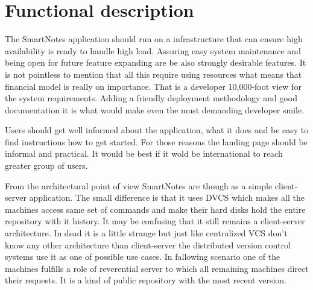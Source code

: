 \section{Functional description}\label{sec:functional_descr}
The SmartNotes application should run on a infrastructure that can ensure high availability is ready to handle high load. Assuring easy system maintenance and being open for future feature expanding are be also strongly desirable features. It is not pointless to mention that all this require using resources what means that financial model is really on importance. That is a developer 10,000-foot view for the system requirements. Adding a friendly deployment methodology and good documentation it is what would make even the must demanding developer smile.

Users should get well informed about the application, what it does and be easy to find instructions how to get started. For those reasons the landing page should be informal and practical. It would be best if it wold be international to reach greater group of users.

From the architectural point of view SmartNotes are though as a simple client-server application. The small difference is that it uses DVCS which makes all the machines access same set of commands and make their hard disks hold the entire repository with it history. It may be confusing that it still remains a client-server architecture. In dead it is a little strange but just like centralized VCS don't know any other architecture than client-server the distributed version control systems use it as one of possible use cases. In fallowing scenario one of the machines fulfills a role of reverential server to which all remaining machines direct their requests. It is a kind of public repository with the most recent version.

